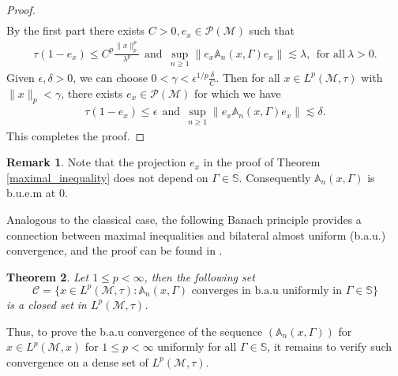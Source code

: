 \documentclass[11pt]{amsart}
\newtheorem{thm}{Theorem}[section]
\theoremstyle{definition}
\theoremstyle{myremark}
\newtheorem{rem}[thm]{Remark}
\numberwithin{equation}{section}
\def\A{\mathbb A}
\def\S{\mathbb S}
\newcommand{\CC}{\mathcal{C}}
\newcommand{\CM}{\mathcal{M}}
\newcommand{\CP}{\mathcal{P}}
\begin{document}
\begin{proof}
\begin{align*}
    \end{align*}
By the first part there exists $C>0, e_x\in \CP(\CM)$ such that
    \begin{align*}
      \tau(1-e_x)\leq C^p\frac{\|x\|_p^p}{\lambda^p} ~~\text{and} ~~ \sup_{n\geq1}\|e
    _x \A_n(x,\Gamma)e_x\| \lesssim \lambda, ~~ \text{for all}~\lambda>0.
    \end{align*}
Given $\epsilon, \delta >0$, we can choose $0<\gamma <\epsilon^{1/p} \frac{\delta}{C}$.
Then for all $x \in L^p(\CM, \tau)$ with $\|x\|_p< \gamma$, there exists $e_x \in \CP(\CM)$ for which we have 
\begin{align*}
    \tau(1-e_x)\leq \epsilon ~~\text{and}~~ \sup_{n\geq 1}\|e_x\A_n(x,\Gamma)e_x\| \lesssim \delta.
\end{align*}
This completes the proof.
\end{proof}




\begin{rem}
    Note that the projection $e_x$ in the proof of Theorem \ref{maximal_inequality} does not depend on $\Gamma \in \S$. Consequently $\A_n(x,\Gamma)$ is b.u.e.m at $0$.
\end{rem}
Analogous to the classical case, the following Banach principle provides a connection between maximal inequalities and bilateral almost uniform 
(b.a.u.) convergence, and the proof can be found in \cite[Theorem 2.1]{Lit2014}.

\begin{thm}\label{Banach_Principle} Let $ 1 \leq p < \infty $, then the following set 
$$ 
\CC = \{ x \in L^p(\CM, \tau) : \A_n(x, \Gamma) \text{ converges in b.a.u uniformly in } \Gamma \in \S \}
$$
is a closed set in $ L^p(\CM, \tau)$. 
\end{thm}
Thus, to prove the b.a.u convergence of the sequence $ ( \A_n(x, \Gamma))$ for $ x \in L^p(\CM, x )$ for $ 1 \leq p < \infty $ uniformly for all $ \Gamma \in \S$, it remains to verify such convergence on a dense set of $ L^p(\CM, \tau)$. 
\end{document}
